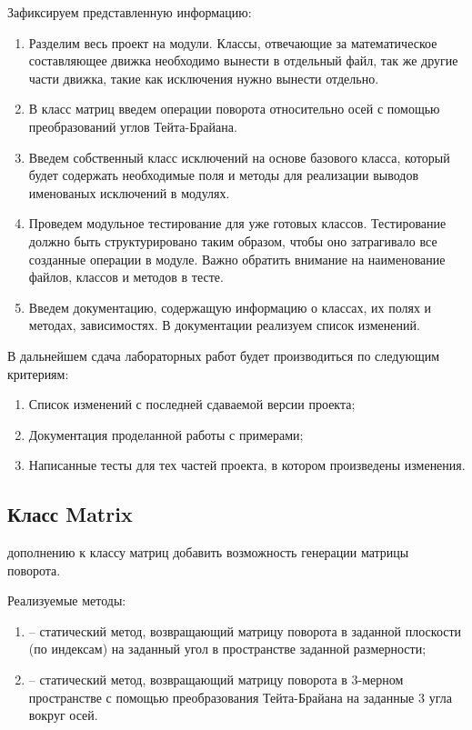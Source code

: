 	Зафиксируем представленную информацию:
	\begin{enumerate}
		\item Разделим весь проект на модули. Классы, отвечающие за математическое составляющее движка необходимо вынести в отдельный файл, так же другие части движка, такие как исключения нужно вынести отдельно.
		\item В класс матриц введем операции поворота относительно осей с помощью преобразований углов Тейта-Брайана.
		\item Введем собственный класс исключений на основе базового класса, который будет содержать необходимые поля и методы для реализации выводов именованых исключений в модулях.
		\item Проведем модульное тестирование для уже готовых классов. Тестирование должно быть структурировано таким образом, чтобы оно затрагивало все созданные операции в модуле. Важно обратить внимание на наименование файлов, классов и методов в тесте.
		\item Введем документацию, содержащую информацию о классах, их полях и методах, зависимостях. В документации реализуем список изменений.

	\end{enumerate}

	В дальнейшем сдача лабораторных работ будет производиться по следующим критериям:
	\begin{enumerate}
		\item Список изменений с последней сдаваемой версии проекта;
		\item Документация проделанной работы с примерами;
		\item Написанные тесты для тех частей проекта, в котором произведены изменения.
	\end{enumerate}

\subsection{Класс Matrix}
	 дополнению к классу матриц добавить возможность генерации матрицы поворота.

	\noindent Реализуемые методы:
	\begin{enumerate}
		\item {} -- статический метод, возвращающий матрицу поворота в заданной плоскости (по индексам) на заданный угол в пространстве заданной размерности;
		\item {} -- статический метод, возвращающий матрицу поворота в $3$-мерном пространстве с помощью преобразования Тейта-Брайана на заданные $3$ угла вокруг осей.
	\end{enumerate}